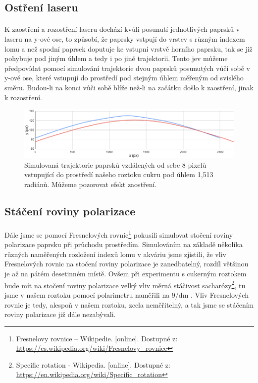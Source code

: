 \documentclass[10pt,a4paper]{article}
\begin{document}
\subsection{Ostření laseru}

\paragraph{}
K zaostření a rozostření laseru dochází kvůli posunutí jednotlivých paprsků v laseru na y-ové ose, to způsobí, že paprsky vstpují do vrstev s různým indexem lomu a než spodní paprsek doputuje ke vstupní vrstvě horního paprsku, tak se již pohybuje pod jiným úhlem a tedy i po jiné trajektorii.
Tento jev můžeme předpovídat pomocí simulování trajektorie dvou paprsků posunutých vůči sobě v y-ové ose, které vstupují do prostředí pod stejným úhlem měřeným od svislého směru. Budou-li na konci vůči sobě blíže než-li na začátku došlo k zaostření, jinak k rozostření.


\begin{figure}[H]
\centering
    \includegraphics[width=\textwidth]{simtraj.png}
    \caption{Simulovaná trajektorie paprsků vzdálených od sebe 8 pixelů vstupující do prostředí našeho roztoku cukru pod úhlem 1,513 radiánů. Můžeme pozorovat efekt zaostření.}
    \label{fig:chart1}
\end{figure}

\subsection{Stáčení roviny polarizace}

\paragraph{}
Dále jsme se pomocí Fresnelových rovnic\footnote{Fresnelovy rovnice – Wikipedie. [online]. Dostupné z: \url{https://cs.wikipedia.org/wiki/Fresnelovy_rovnice}}
 pokusili simulovat stočení roviny polarizace paprsku při průchodu prostředím. Simulováním na základě několika různých naměřených rozložení indexů lomu v akváriu jsme zjistili, že vliv Fresnelových rovnic na stočení roviny polarizace je zanedbatelný, rozdíl většinou je až na pátém desetinném místě. Ovšem při experimentu s cukerným roztokem bude mít na stočení roviny polarizace velký vliv měrná stáčivost sacharózy\footnote{Specific rotation - Wikipedia. [online]. Dostupné z: \url{https://en.wikipedia.org/wiki/Specific_rotation}}, tu jsme v našem roztoku pomocí polarimetru naměřili na 9\degree{}/dm
 .
 Vliv Fresnelových rovnic je tedy, alespoň v našem roztoku, zcela neměřitelný, a tak jsme se stáčením roviny polarizace již dále nezabývali.
\end{document}
